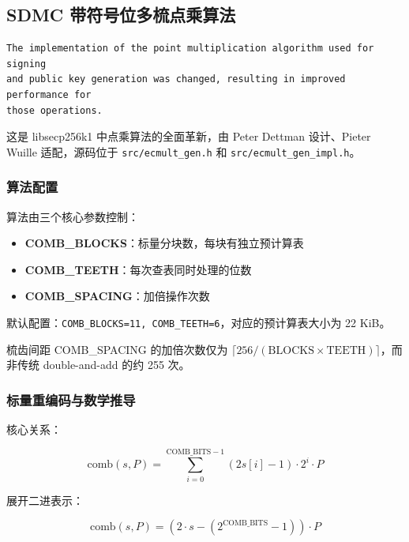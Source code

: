 \documentclass[a4paper,12pt]{ctexart}
\begin{document}
\subsection{SDMC 带符号位多梳点乘算法}
\begin{codebox}
\begin{verbatim}
The implementation of the point multiplication algorithm used for signing
and public key generation was changed, resulting in improved performance for
those operations.
\end{verbatim}
\end{codebox}

这是 libsecp256k1 中点乘算法的全面革新，由 Peter Dettman 设计、Pieter Wuille 适配，源码位于 \texttt{src/ecmult\_gen.h} 和 \texttt{src/ecmult\_gen\_impl.h}。

\subsubsection{算法配置}

算法由三个核心参数控制：

\begin{itemize}[leftmargin=*]
  \item \textbf{COMB\_BLOCKS}：标量分块数，每块有独立预计算表
  \item \textbf{COMB\_TEETH}：每次查表同时处理的位数
  \item \textbf{COMB\_SPACING}：加倍操作次数
\end{itemize}

默认配置：\texttt{COMB\_BLOCKS=11, COMB\_TEETH=6}，对应的预计算表大小为 22 KiB。

梳齿间距 COMB\_SPACING 的加倍次数仅为 $\lceil 256 / (\text{BLOCKS} \times \text{TEETH}) \rceil$，而非传统 double-and-add 的约 255 次。

\subsubsection{标量重编码与数学推导}

核心关系：

\begin{equation}
\text{comb}(s, P) = \sum_{i=0}^{\text{COMB\_BITS}-1} (2s[i]-1) \cdot 2^{i} \cdot P
\end{equation}

展开二进表示：

\begin{equation}
\text{comb}(s, P) = (2 \cdot s - (2^{\text{COMB\_BITS}} - 1)) \cdot P
\end{equation}
\end{document}
